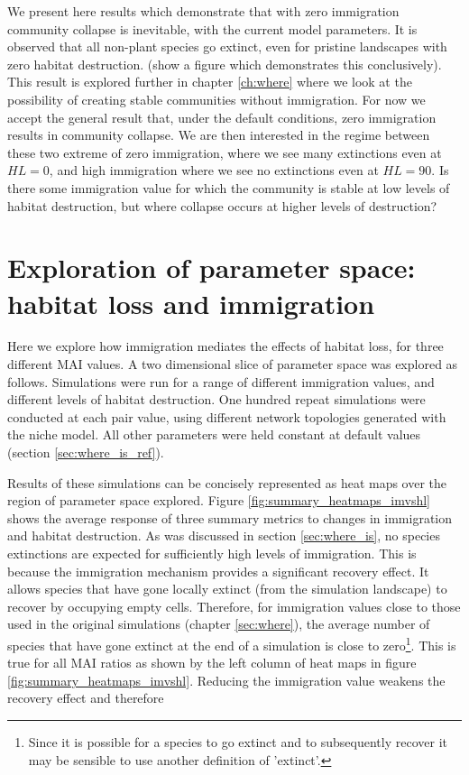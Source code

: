 We present here results which demonstrate that with zero immigration community collapse is inevitable, with the current model parameters. It is observed that all non-plant species go extinct, even for pristine landscapes with zero habitat destruction. (show a figure which demonstrates this conclusively). This result is explored further in chapter \ref{ch:where} where we look at the possibility of creating stable communities without immigration. For now we accept the general result that, under the default conditions, zero immigration results in community collapse. We are then interested in the regime between these two extreme of zero immigration, where we see many extinctions even at $HL=0$, and high immigration where we see no extinctions even at $HL=90$. Is there some immigration value for which the community is stable at low levels of habitat destruction, but where collapse occurs at higher levels of destruction?


\section{Exploration of parameter space: habitat loss and immigration}
\label{sec:heatmaps}

Here we explore how immigration mediates the effects of habitat loss, for three different MAI values. A two dimensional slice of parameter space was explored as follows. Simulations were run for a range of different immigration values, and different levels of habitat destruction. One hundred repeat simulations were conducted at each pair value, using different network topologies generated with the niche model. All other parameters were held constant at default values (section \ref{sec:where_is_ref}). 

Results of these simulations can be concisely represented as heat maps over the region of parameter space explored. Figure \ref{fig:summary_heatmaps_imvshl} shows the average response of three summary metrics to changes in immigration and habitat destruction. As was discussed in section \ref{sec:where_is}, no species extinctions are expected for sufficiently high levels of immigration. This is because the immigration mechanism provides a significant recovery effect. It allows species that have gone locally extinct (from the simulation landscape) to recover by occupying empty cells. Therefore, for immigration values close to those used in the original simulations (chapter \ref{sec:where}), the average number of species that have gone extinct at the end of a simulation is close to zero\footnote{Since it is possible for a species to go extinct and to subsequently recover it may be sensible to use another definition of 'extinct'.}. This is true for all MAI ratios as shown by the left column of heat maps in figure \ref{fig:summary_heatmaps_imvshl}. Reducing the immigration value weakens the recovery effect and therefore

